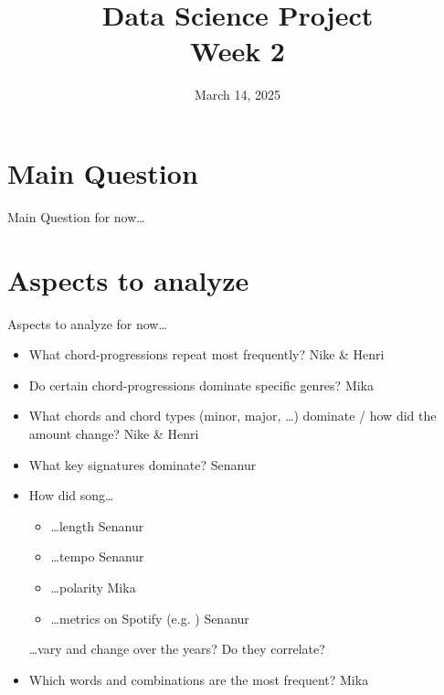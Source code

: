 

\title[Data Science Project: Week 2]{Data Science Project \\ \small Week 2}
\date{March 14, 2025}


    \maketitle
    
    \section{Main Question}
    \begin{frame}{Main Question {\tiny for now\dots}}
        \centering\huge
    \end{frame}
    
    \section{Aspects to analyze}
    \begin{frame}[allowframebreaks]{Aspects to analyze {\tiny for now\dots}}
        \begin{itemize}
            \item What chord-progressions repeat most frequently? \alert{Nike \& Henri}
            \item Do certain chord-progressions dominate specific genres? \alert{Mika}
            \item What chords and chord types (minor, major, \dots) dominate / how did the amount change? \alert{Nike \& Henri}
            \item What key signatures dominate? \alert{Senanur}
        \framebreak
            \item How did song\dots
                \begin{itemize}
                    \item \dots length \alert{Senanur}
                    \item \dots tempo \alert{Senanur}
                    \item \dots polarity \alert{Mika}
                    \item \dots metrics on Spotify (e.g. \textit{}) \alert{Senanur}
                \end{itemize}
                \dots vary and change over the years? Do they correlate?
            \item Which words and combinations are the most frequent? \alert{Mika}
        \end{itemize}
    \end{frame}

